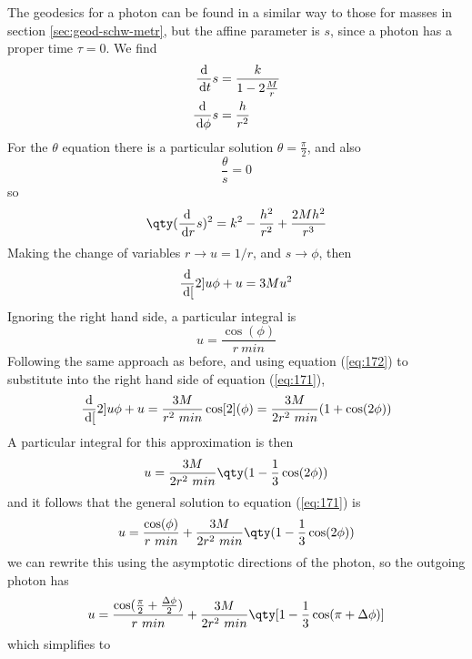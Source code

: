 The geodesics for a photon can be found in a similar way to those for
masses in section \ref{sec:geod-schw-metr}, but the affine parameter
is $s$, since a photon has a proper time $\tau = 0$. We find
\begin{subequations}
  \begin{align}
    \frac{\mathrm{d}}{\,\mathrm{d} t}{s} &= \frac{k}{1 - 2 \frac{M}{r}} \\ \frac{\mathrm{d}}{\,\mathrm{d} \phi}{s} &= \frac{h}{r^2}
  \end{align}
\end{subequations}
For the $\theta$ equation there is a particular solution
$\theta=\frac{\pi}{2}$, and also \[ \frac{\theta}{s}=0 \]
so
\begin{equation}
  \label{eq:170}
  \qty( \dv{r}{s})^2 = k^2 - \frac{h^2}{r^2} + \frac{2 M h^2}{r^3} 
\end{equation}
Making the change of variables $r \to u = 1/r$, and $s \to \phi$, then
\begin{equation}
  \label{eq:171}
  \frac{\mathrm{d}}{\,\mathrm{d} [}2]{u}{\phi} + u = 3 M u^2
\end{equation}
Ignoring the right hand side, a particular integral is 
\begin{equation}
  \label{eq:172}
  u = \frac{\cos(\phi)}{r~{min}}
\end{equation}
Following the same approach as before, and using equation
(\ref{eq:172}) to substitute into the right hand side of equation
(\ref{eq:171}),
\begin{equation}
  \label{eq:173}
  \frac{\mathrm{d}}{\,\mathrm{d} [}2]{u}{\phi} + u = \frac{3M}{r^2~{min}} \cos[2](\phi) = \frac{3M}{2 r^2~{min}} (1 + \cos(2 \phi))
\end{equation}
A particular integral for this approximation is then
\begin{equation}
  \label{eq:174}
  u = \frac{3M}{2 r^2~{min}} \qty(1 - \frac{1}{3} \cos(2 \phi) )
\end{equation}
and it follows that the general solution to equation (\ref{eq:171}) is
\begin{equation}
  \label{eq:175}
  u = \frac{\cos(\phi)}{r~{min}} + \frac{3M}{2 r^2~{min}} \qty( 1 - \frac{1}{3} \cos(2 \phi) )
\end{equation}
we can rewrite this using the asymptotic directions of the photon, so the outgoing photon has
\begin{equation*}
  \label{eq:176}
  u = \frac{\cos( \frac{\pi}{2} + \frac{\Delta \phi}{2})}{r~{min}} + \frac{3 M}{2 r^2~{min}} \qty[1-\frac{1}{3} \cos(\pi + \Delta \phi) ]
\end{equation*}
which simplifies to
